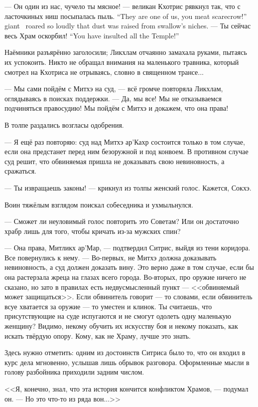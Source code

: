 {--- Он один из нас, чучело ты мясное! --- великан Кхотрис рявкнул так, что с ласточкиных ниш посыпалась пыль.}
{``They are one of us, you meat scarecrow!'' giant \Kchotris\ roared so loudly that dust was raised from swallow's niches.}
{--- Ты сейчас весь Храм оскорбил!}
{``You have insulted all the Temple!''}

Наёмники разъярённо заголосили;
Ликхлам отчаянно замахала руками, пытаясь их успокоить.
Никто не обращал внимания на маленького травника, который смотрел на Кхотриса не отрываясь, словно в священном трансе...

--- Мы сами пойдём с Митхэ на суд, --- всё громче повторяла Ликхлам, оглядываясь в поисках поддержки.
--- Да, мы все!
Мы не отказываемся подчиняться правосудию!
Мы пойдём с Митхэ и докажем, что она права!

В толпе раздались возгласы одобрения.

--- Я ещё раз повторяю: суд над Митхэ ар'Кахр состоится только в том случае, если она предстанет перед ним безоружной и под конвоем.
В противном случае суд решит, что обвиняемая пришла не доказывать свою невиновность, а сражаться.

--- Ты извращаешь законы! --- крикнул из толпы женский голос.
Кажется, Сокхэ.

Воин тяжёлым взглядом поискал собеседника и ухмыльнулся.

--- Сможет ли неуловимый голос повторить это Советам?
Или он достаточно храбр лишь для того, чтобы кричать из-за мужских спин?

--- Она права, Митликх ар'Мар, --- подтвердил Ситрис, выйдя из тени коридора.
Все повернулись к нему.
--- Во-первых, не Митхэ должна доказывать невиновность, а суд должен доказать вину.
Это верно даже в том случае, если бы она растерзала жреца на глазах всего города.
Во-вторых, про оружие ничего не сказано, но зато в правилах есть недвусмысленный пункт --- <<обвиняемый может защищаться>>.
Если обвинитель говорит --- то словами, если обвинитель всуе хватается за оружие --- то уместен и клинок.
Ты считаешь, что присутствующие на суде испугаются и не смогут одолеть одну маленькую женщину?
Видимо, некому обучить их искусству боя и некому показать, как искать твёрдую опору.
Кому, как не Храму, лучше это знать.

Здесь нужно отметить: одним из достоинств Ситриса было то, что он входил в курс дела мгновенно, услышав лишь обрывок разговора.
Оформленные мысли в голову разбойника приходили задним числом.

<<Я, конечно, знал, что эта история кончится конфликтом Храмов, --- подумал он. --- Но это что-то из ряда вон...>>

